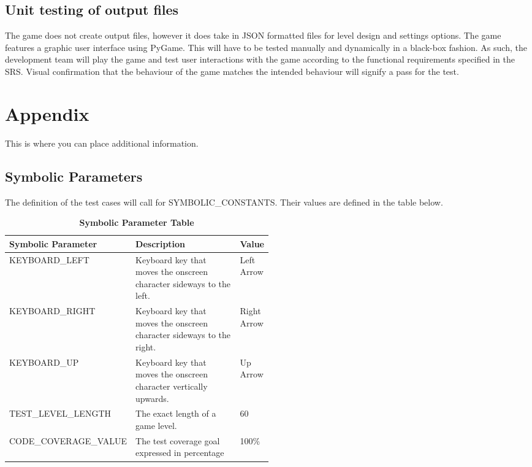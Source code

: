 \documentclass[12pt, titlepage]{article}
\begin{document}
\subsection{Unit testing of output files}
    The game does not create output files, however it does take in JSON formatted files for level design and settings options. The game features a graphic user interface using PyGame. This will have to be tested manually and dynamically in a black-box fashion. As such, the development team will play the game and test user interactions with the game according to the functional requirements specified in the SRS. Visual confirmation that the behaviour of the game matches the intended behaviour will signify a pass for the test.




\newpage

\section{Appendix}

This is where you can place additional information.

\subsection{Symbolic Parameters}

The definition of the test cases will call for SYMBOLIC\_CONSTANTS.
Their values are defined in the table below.

\begin{table}[H]
\caption{\bf Symbolic Parameter Table}
\begin{tabular}{|l|p{0.5\linewidth}|l|}
\hline
\multicolumn{1}{|l}{\bfseries Symbolic Parameter} & \multicolumn{1}{|l|}{\bfseries Description} & \multicolumn{1}{l|}{\bfseries Value}\\
\hline
KEYBOARD\_LEFT & Keyboard key that moves the onscreen character sideways to the left. & Left Arrow \\
\hline
KEYBOARD\_RIGHT & Keyboard key that moves the onscreen character sideways to the right. & Right Arrow \\
\hline
KEYBOARD\_UP & Keyboard key that moves the onscreen character vertically upwards. & Up Arrow\\
\hline
TEST\_LEVEL\_LENGTH & The exact length of a game level. & 60\\
\hline
CODE\_COVERAGE\_VALUE & The test coverage goal expressed in percentage & 100\%\\
\hline
\end{tabular}
\end{table}
\end{document}
